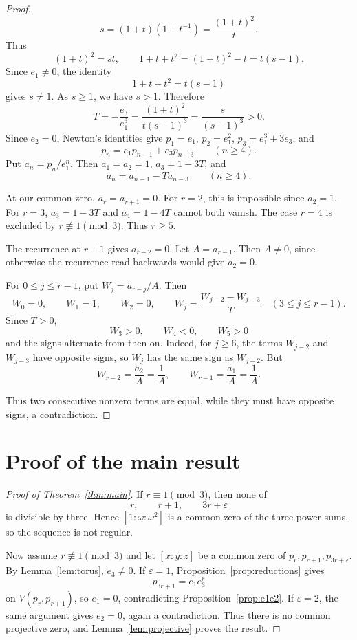 \documentclass[preprint,12pt]{elsarticle}
\begin{document}
\begin{proof}
$$
s=(1+t)(1+t^{-1})=\frac{(1+t)^2}{t}.
$$
Thus
$$
(1+t)^2=st,\qquad
1+t+t^2=(1+t)^2-t=t(s-1).
$$
Since $e_1\neq0$, the identity
$$
1+t+t^2=t(s-1)
$$
gives $s\neq1$. As $s\geq1$, we have $s>1$. Therefore
$$
T=-\frac{e_3}{e_1^3}
=\frac{(1+t)^2}{t(s-1)^3}
=\frac{s}{(s-1)^3}>0.
$$
Since $e_2=0$, Newton's identities give
$p_1=e_1$, $p_2=e_1^2$, $p_3=e_1^3+3e_3$, and
$$
p_n=e_1p_{n-1}+e_3p_{n-3}\qquad(n\geq4).
$$
Put $a_n=p_n/e_1^n$. Then
$a_1=a_2=1$, $a_3=1-3T$, and
$$
a_n=a_{n-1}-Ta_{n-3}\qquad(n\geq4).
$$

At our common zero, $a_r=a_{r+1}=0$. For $r=2$, this is impossible
since $a_2=1$. For $r=3$,
$a_3=1-3T$ and $a_4=1-4T$ cannot both vanish. The case $r=4$
is excluded by $r\not\equiv1\pmod3$. Thus $r\geq5$.

The recurrence at $r+1$ gives $a_{r-2}=0$. Let
$A=a_{r-1}$. Then $A\neq0$, since otherwise the recurrence read
backwards would give $a_2=0$.

For $0\leq j\leq r-1$, put $W_j=a_{r-j}/A$. Then
$$
W_0=0,\qquad W_1=1,\qquad W_2=0,
\qquad
W_j=\frac{W_{j-2}-W_{j-3}}{T}
\quad(3\leq j\leq r-1).
$$
Since $T>0$,
$$
W_3>0,\qquad W_4<0,\qquad W_5>0
$$
and the signs alternate from then on. Indeed, for $j\geq6$, the terms
$W_{j-2}$ and $W_{j-3}$ have opposite signs, so $W_j$ has the
same sign as $W_{j-2}$.
But
$$
W_{r-2}=\frac{a_2}{A}=\frac1A,
\qquad
W_{r-1}=\frac{a_1}{A}=\frac1A.
$$

Thus two consecutive nonzero terms are equal, while they must have
opposite signs, a contradiction.
\end{proof}

\section{Proof of the main result}

\begin{proof}[Proof of Theorem~\ref{thm:main}]
If $r\equiv1\pmod3$, then none of
$$
r,\qquad r+1,\qquad 3r+\varepsilon
$$
is divisible by three. Hence $[1:\omega:\omega^2]$ is a common zero of the
three power sums, so the sequence is not regular.

Now assume $r\not\equiv1\pmod3$ and let $[x:y:z]$ be a common zero of
$p_r,p_{r+1},p_{3r+\varepsilon}$. By Lemma~\ref{lem:torus}, $e_3\neq0$.
If $\varepsilon=1$, Proposition~\ref{prop:reductions} gives
$$
p_{3r+1}=e_1e_3^r
$$
on $V(p_r,p_{r+1})$, so $e_1=0$, contradicting
Proposition~\ref{prop:e1e2}. If $\varepsilon=2$, the same argument gives
$e_2=0$, again a contradiction. Thus there is no common projective zero, and
Lemma~\ref{lem:projective} proves the result.
\end{proof}
\end{document}
